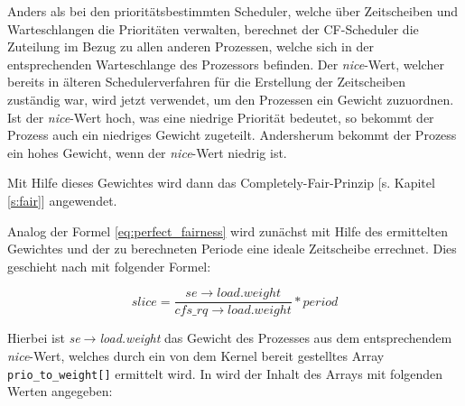 Anders als bei den prioritäts\-bestim\-mten Scheduler, welche über Zeitscheiben und Warte\-schlan\-gen die Prioritäten verwalten, berechnet der CF-Scheduler die Zuteilung im Bezug zu allen anderen Prozessen, welche sich in der entsprechenden Warteschlange des Prozessors befinden. Der  \textit{nice}-Wert, welcher bereits in älteren Scheduler\-ver\-fahren für die Erstellung der Zeitscheiben zuständig war, wird jetzt verwendet, um den Prozessen ein Gewicht zuzuordnen. Ist der  \textit{nice}-Wert hoch, was eine niedrige Priorität bedeutet, so bekommt der Prozess auch ein niedriges Gewicht zugeteilt. Andersherum bekommt der Prozess ein hohes Gewicht, wenn der  \textit{nice}-Wert niedrig ist.

Mit Hilfe dieses Gewichtes wird dann das  Completely-Fair-Prinzip [s. Kapitel \ref{s:fair}] angewendet. 

Analog der Formel \ref{eq:perfect_fairness} wird zunächst mit Hilfe des ermittelten Gewichtes und der zu berechneten  Periode eine ideale Zeitscheibe errechnet. Dies geschieht nach \cite{paperfairness} mit folgender Formel:  

\begin{equation}
slice = \frac{se\rightarrow load.weight}{cfs\_rq\rightarrow load.weight} * period
\label{eq:slice}
\end{equation}

Hierbei ist \textit{se$\rightarrow$load.weight} das Gewicht des Prozesses aus dem entsprechendem \textit{nice}-Wert, welches durch ein von dem Kernel bereit gestelltes Array \texttt{prio\_to\_weight[]} ermittelt wird. In \cite{nikita} wird der Inhalt des Arrays mit folgenden Werten angegeben:

